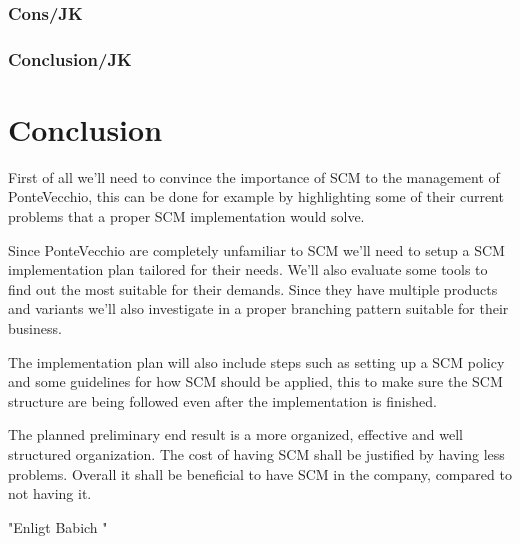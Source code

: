 \documentclass[10pt]{article}
\begin{document}
\subsubsection{Cons/JK}
\subsubsection{Conclusion/JK}

\section{Conclusion}

First of all we’ll need to convince the importance of SCM to the management of PonteVecchio, this can be done for example by highlighting some of their current problems that a proper SCM implementation would solve.

\noindent Since PonteVecchio are completely unfamiliar to SCM we’ll need to setup a SCM implementation plan tailored for their needs. We’ll also evaluate some tools to find out the most suitable for their demands. 
Since they have multiple products and variants we’ll also investigate in a proper branching pattern suitable for their business.

\noindent The implementation plan will also include steps such as setting up a SCM policy and some guidelines for how SCM should be applied, this to make sure the SCM structure are being followed even after the implementation is finished.

\noindent The planned preliminary end result is a more organized, effective and well structured organization. The cost of having SCM shall be justified by having less problems. Overall it shall be beneficial to have SCM in the company, compared to not having it.


"Enligt Babich \cite{Babich}"
\end{document}
